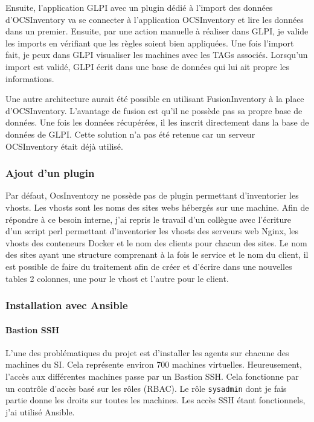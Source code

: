 \documentclass[12pt]{article}
\begin{document}
Ensuite, l'application GLPI avec un plugin dédié à l'import des données d'OCSInventory va se connecter à l'application OCSInventory et lire les données dans un premier.
Ensuite, par une action manuelle à réaliser dans GLPI, je valide les imports en vérifiant que les règles soient bien appliquées. 
Une fois l'import fait, je peux dans GLPI visualiser les machines avec les TAGs associés. 
Lorsqu'un import est validé, GLPI écrit dans une base de données qui lui ait propre les informations.

Une autre architecture aurait été possible en utilisant FusionInventory à la place d'OCSInventory. 
L'avantage de fusion est qu'il ne possède pas sa propre base de données. 
Une fois les données récupérées, il les inscrit directement dans la base de données de GLPI. 
Cette solution n'a pas été retenue car un serveur OCSInventory était déjà utilisé.

\subsubsection{Ajout d'un plugin}
Par défaut, OcsInventory ne possède pas de plugin permettant d'inventorier les vhosts. 
Les vhosts sont les noms des sites webs hébergés sur une machine. 
Afin de répondre à ce besoin interne, j'ai repris le travail d'un collègue avec l'écriture d'un script perl permettant d'inventorier les vhosts des serveurs web Nginx, les vhosts des conteneurs Docker et le nom des clients pour chacun des sites. 
Le nom des sites ayant une structure comprenant à la fois le service et le nom du client, il est possible de faire du traitement afin de créer et d'écrire dans une nouvelles tables 2 colonnes, une pour le vhost et l'autre pour le client.

\subsubsection{Installation avec Ansible}
\paragraph{Bastion SSH}
L'une des problématiques du projet est d'installer les agents sur chacune des machines du SI. 
Cela représente environ 700 machines virtuelles. 
Heureusement, l'accès aux différentes machines passe par un Bastion SSH. 
Cela fonctionne par un contrôle d'accès basé sur les rôles (RBAC). 
Le rôle \verb|sysadmin| dont je fais partie donne les droits sur toutes les machines. 
Les accès SSH étant fonctionnels, j'ai utilisé Ansible.
\end{document}
